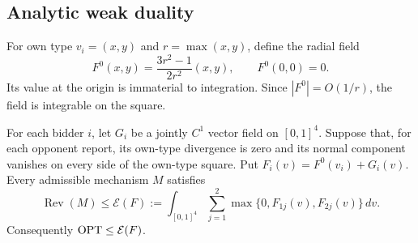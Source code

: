\subsection{Analytic weak duality}\label{subsec:analytic}

For own type \(v_i=(x,y)\) and \(r=\max(x,y)\), define the radial field
\[
F^0(x,y)=\frac{3r^2-1}{2r^2}(x,y),\qquad F^0(0,0)=0.
\]
Its value at the origin is immaterial to integration.  Since
\(|F^0|=O(1/r)\), the field is integrable on the square.

\begin{theorem}\label{thm:stream}
For each bidder \(i\), let \(G_i\) be a jointly \(C^1\) vector field on
\([0,1]^4\).  Suppose that, for each opponent report, its own-type divergence
is zero and its normal component vanishes on every side of the own-type
square.  Put \(F_i(v)=F^0(v_i)+G_i(v)\).  Every admissible mechanism \(M\)
satisfies
\begin{equation}\label{eq:stream-envelope}
\operatorname{Rev}(M)\leq
\mathcal E(F):=\int_{[0,1]^4}\sum_{j=1}^2
\max\{0,F_{1j}(v),F_{2j}(v)\}\,dv.
\end{equation}
Consequently \(\operatorname{OPT}\leq\mathcal E(F)\).
\end{theorem}

